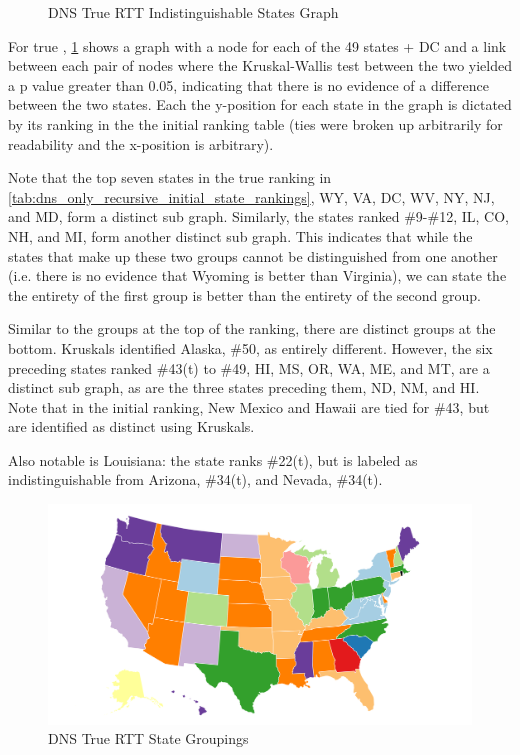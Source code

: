 \begin{figure}[H]
    \centering
    
    \caption{DNS True RTT Indistinguishable States Graph}
    \label{fig:dns_true_rtt_indistinguishable_states_graph}
\end{figure}

For true \rtt, \cref{fig:dns_true_rtt_indistinguishable_states_graph} shows a graph with a node for each of the 49 states + DC and a link between each pair of nodes where the Kruskal-Wallis test between the two yielded a p value greater than 0.05, indicating that there is no evidence of a difference between the two states. Each the y-position for each state in the graph is dictated by its ranking in the the initial ranking table (ties were broken up arbitrarily for readability and the x-position is arbitrary). 

Note that the top seven states in the true \rtt ranking in \cref{tab:dns_only_recursive_initial_state_rankings}, WY, VA, DC, WV, NY, NJ, and MD, form a distinct sub graph. Similarly, the states ranked \#9-\#12, IL, CO, NH, and MI, form another distinct sub graph. This indicates that while the states that make up these two groups cannot be distinguished from one another (i.e. there is no evidence that Wyoming is better than Virginia), we can state the the entirety of the first group is better than the entirety of the second group.

Similar to the groups at the top of the ranking, there are distinct groups at the bottom. Kruskals identified Alaska, \#50, as entirely different. However, the six preceding states ranked \#43(t) to \#49, HI, MS, OR, WA, ME, and MT, are a distinct sub graph, as are the three states preceding them, ND, NM, and HI. Note that in the initial ranking, New Mexico and Hawaii are tied for \#43, but are identified as distinct using Kruskals.

Also notable is Louisiana: the state ranks \#22(t), but is labeled as indistinguishable from Arizona, \#34(t), and Nevada, \#34(t).

\begin{figure}[H]
    \centering
    \includegraphics[width=\textwidth]{images/dns/analysis_no_auth_agg/rtt/no_auth_distinct_rtt_map.png}
    \caption{DNS True RTT State Groupings}
    \label{fig:dns_true_rtt_indistinguishable_states_map}
\end{figure}

